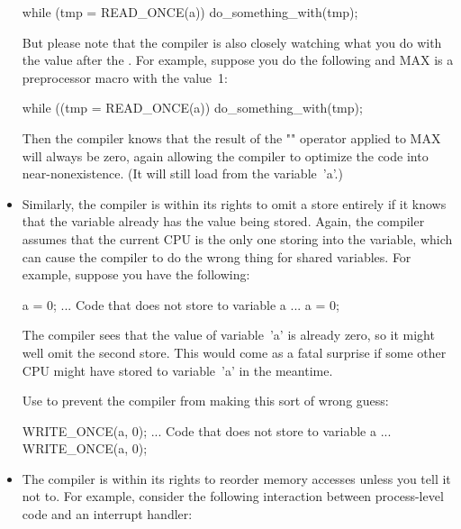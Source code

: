 \begin{itemize}
\begin{VerbatimU}
	while (tmp = READ_ONCE(a))
		do_something_with(tmp);
\end{VerbatimU}

     But please note that the compiler is also closely watching what you
     do with the value after the .
     For example, suppose you do the following and MAX is a preprocessor
     macro with the value~1:

\begin{VerbatimU}
	while ((tmp = READ_ONCE(a)) %
		do_something_with(tmp);
\end{VerbatimU}

     Then the compiler knows that the result of the "\co{\%}" operator applied
     to MAX will always be zero, again allowing the compiler to optimize
     the code into near-nonexistence.
     (It will still load from the variable~'a'.)

 \item
     Similarly, the compiler is within its rights to omit a store entirely
     if it knows that the variable already has the value being stored.
     Again, the compiler assumes that the current CPU is the only one
     storing into the variable, which can cause the compiler to do the
     wrong thing for shared variables.
     For example, suppose you have the following:

\begin{VerbatimU}
	a = 0;
	... Code that does not store to variable a ...
	a = 0;
\end{VerbatimU}

     The compiler sees that the value of variable~'a' is already zero, so
     it might well omit the second store.
     This would come as a fatal surprise if some other CPU might have
     stored to variable~'a' in the meantime.

     Use  to prevent the compiler from making this sort of
     wrong guess:

\begin{VerbatimU}
	WRITE_ONCE(a, 0);
	... Code that does not store to variable a ...
	WRITE_ONCE(a, 0);
\end{VerbatimU}

\item
     The compiler is within its rights to reorder memory accesses unless
     you tell it not to.
     For example, consider the following interaction between process-level
     code and an interrupt handler:


\end{itemize}
